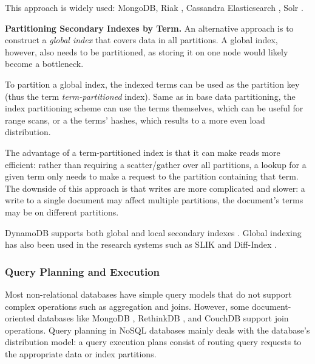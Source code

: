 This approach is widely used: MongoDB, Riak \cite{riakv:secondaryindexes}, Cassandra \cite{cassandra:secondaryindexing}
Elasticsearch \cite{elastic:docrouting}, Solr \cite{solr:indexsharding}.

\bigskip

\noindent
\textbf{Partitioning Secondary Indexes by Term.}
An alternative approach is to construct a \textit{global index} that covers data in all partitions.
A global index, however, also needs to be partitioned, as storing it on one node would likely become a bottleneck.

To partition a global index, the indexed terms can be used as the partition key (thus the term \textit{term-partitioned}
index).
Same as in base data partitioning, the index partitioning scheme can use the terms themselves, which can be useful for
range scans, or a the terms' hashes, which results to a more even load distribution.

The advantage of a term-partitioned index is that it can make reads more efficient:
rather than requiring a scatter/gather over all partitions, a lookup for a given term only needs to make a request to the
partition containing that term.
The downside of this approach is that writes are more complicated and slower:
a write to a single document may affect multiple partitions, the document's terms may be on different partitions.

DynamoDB supports both global and local secondary indexes \cite{dynamodb:secondaryindexes}.
Global indexing has also been used in the research systems such as SLIK \cite{kejriwal:slik} and Diff-Index \cite{tan:diffindex}.

\subsubsection{Query Planning and Execution}

Most non-relational databases have simple query models that do not support complex operations such as aggregation and
joins.
However, some document-oriented databases like MongoDB \cite{mongodb:joins}, RethinkDB \cite{rethinkdb:joins}, and CouchDB \cite{couchdb:joins} support join operations.
Query planning in NoSQL databases mainly deals with the database's distribution model:
a query execution plans consist of routing query requests to the appropriate data or index partitions.


